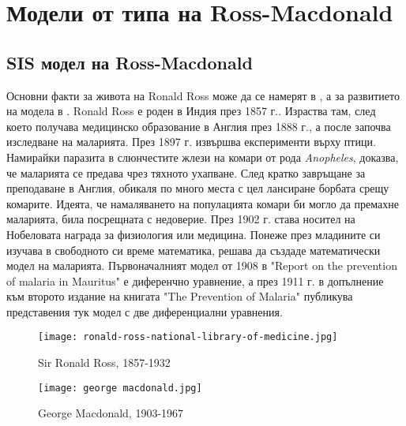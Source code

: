 \section{\hspace{1em} Модели от типа на Ross-Macdonald}

\subsection{SIS модел на Ross-Macdonald}

Основни факти за живота на Ronald Ross може да се намерят в \cite[глава~12]{Bacaer2011}, а за развитието на модела в \cite{Smith2012}.
Ronald Ross е роден в Индия през 1857 г..
Израства там, след което получава медицинско образование в Англия през 1888 г., а после започва изследване на маларията.
През 1897 г. извършва експерименти върху птици.
Намирайки паразита в слюнчестите жлези на комари от рода \textit{Anopheles}, доказва, че маларията се предава чрез тяхното ухапване.
След кратко завръщане за преподаване в Англия, обикаля по много места с цел лансиране борбата срещу комарите. Идеята, че намаляването на популацията комари би могло да премахне маларията, била посрещната с недоверие.
През 1902 г. става носител на Нобеловата награда за физиология или медицина.
Понеже през младините си изучава в свободното си време математика, решава да създаде математически модел на маларията.
Първоначалният модел от 1908 в "Report on the prevention of malaria in Mauritus" е диференчно уравнение, а през 1911 г. в допълнение към второто издание на книгата "The Prevention of Malaria" публикува представения тук модел с две диференциални уравнения.



\begin{figure}[H]
  \centering
  \begin{minipage}{.5\textwidth}
    \centering
    \texttt{[image: ronald-ross-national-library-of-medicine.jpg]}
    \caption{Sir Ronald Ross, 1857-1932}
    \label{fig:Ross}
    \end{minipage}%
    \begin{minipage}{.5\textwidth}
    \centering
    \texttt{[image: george macdonald.jpg]}
    \caption{George Macdonald, 1903-1967}
    \label{fig:Macdonald}
  \end{minipage}
\end{figure}

